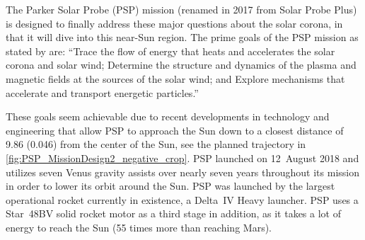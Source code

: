 The Parker Solar Probe (PSP) mission (renamed in 2017 from Solar Probe Plus) is designed to finally address these major questions about the solar corona, in that it will dive into this near-Sun region. The prime goals of the PSP mission as stated by \citet{Fox2015} are: ``Trace the flow of energy that heats and accelerates the solar corona and solar wind; Determine the structure and dynamics of the plasma and magnetic fields at the sources of the solar wind; and Explore mechanisms that accelerate and transport energetic particles.''
\begin{figure}[htb]
\end{figure}
These goals seem achievable due to recent developments in technology and engineering that allow PSP to approach the Sun down to a closest distance of \SI{9.86}{\Rs} (\SI{0.046}{\au}) from the center of the Sun, see the planned trajectory in \autoref{fig:PSP_MissionDesign2_negative_crop}. PSP launched on 12~August 2018 and utilizes seven Venus gravity assists over nearly seven years throughout its mission in order to lower its orbit around the Sun. PSP was launched by the largest operational rocket currently in existence, a Delta~IV Heavy launcher. PSP uses a Star~48BV solid rocket motor as a third stage in addition, as it takes a lot of energy to reach the Sun (55 times more than reaching Mars).

